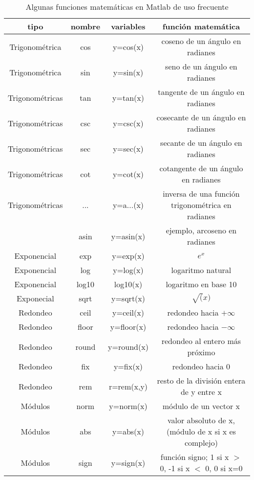 \begin{table}
\caption{Algunas funciones matemáticas en Matlab de uso frecuente}
\label{tabfun}
\begin{tabular}{c|c|c|c}
tipo&nombre&variables&función matemática\\
\hline
\hline
Trigonométrica&cos&y=cos(x)&coseno de un ángulo en radianes\\
\hline
Trigonométrica&sin&y=sin(x)&seno de un ángulo en radianes\\
\hline
Trigonométricas&tan&y=tan(x)&tangente de un ángulo en radianes\\
\hline
Trigonométricas&csc&y=csc(x)&cosecante de un ángulo en radianes\\
\hline
Trigonométricas&sec&y=sec(x)&secante de un ángulo en radianes\\
\hline
Trigonométricas&cot&y=cot(x)&cotangente de un ángulo en radianes\\

\hline
Trigonométricas&...&y=a...(x)&inversa de una función trigonométrica en radianes\\
&asin&y=asin(x)&ejemplo, arcoseno en radianes\\
\hline
\hline
Exponencial&exp&y=exp(x)&$e^x$\\
\hline
Exponencial&log&y=log(x)&logaritmo natural\\
\hline
Exponencial&log10&log10(x)&logaritmo en base 10\\
\hline
Exponecial&sqrt&y=sqrt(x)&$\sqrt(x)$\\
\hline
\hline
Redondeo&ceil&y=ceil(x)& redondeo hacia $+\infty$\\
\hline
Redondeo&floor&y=floor(x)&redondeo hacia $-\infty$\\
\hline
Redondeo&round&y=round(x)&redondeo al entero más próximo\\
\hline
Redondeo&fix&y=fix(x)&redondeo hacia $0$\\
\hline
Redondeo&rem&r=rem(x,y)&resto de la división entera de y entre x\\
\hline
\hline
Módulos&norm&y=norm(x)& módulo de un vector x\\
\hline
Módulos&abs&y=abs(x)&valor absoluto de x,(módulo de x si x es complejo)\\
\hline
Módulos&sign&y=sign(x)&función signo; 1 si x $>$ 0, -1 si x $<$ 0, 0 si x=0\\
\end{tabular}
\end{table}
